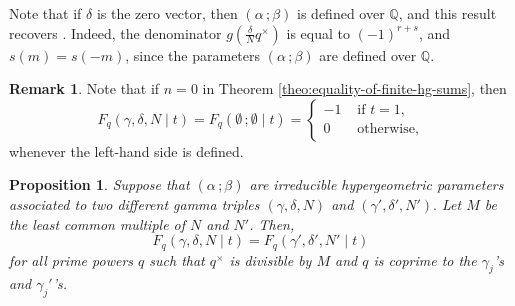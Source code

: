 \documentclass[11pt, reqno]{amsart}
\theoremstyle{plain}
\newtheorem{prop}[theo]{Proposition}
\theoremstyle{definition}
\newtheorem{rem}[theo]{Remark}
\newcommand{\Q}{\mathbb{Q}}
\newcommand{\ga}{\gamma}
\newcommand{\be}{\beta}
\newcommand{\al}{\alpha}
\begin{document}
Note that if $\delta$ is the zero vector, then $ (\al \, ;  \beta) $ is defined over $\Q$, and this result recovers \cite[Theorem 1.3]{BCM}.
Indeed, the denominator $g\left(\frac{\delta}{N} q^\times\right)$ is equal to $(-1)^{r+s}$, and $s(m) = s(-m)$, since the parameters $(\al \, ; \be)$ are defined over $\Q$.
\begin{rem}
Note that if $n=0$ in Theorem \ref{theo:equality-of-finite-hg-sums}, then
\[
F_q(\ga,\delta, N \mid t) = F_q (\emptyset\, ; \emptyset \mid t) = 
\begin{cases}
-1 &  \text{ if } t=1 , \\
0 & \text{ otherwise,}
\end{cases}
\]
whenever the left-hand side is defined. 

\end{rem}
\begin{prop}\label{prop:uniqueness-extensions}
    Suppose that $(\al \,;\be)$ are irreducible hypergeometric parameters associated to two different gamma triples $(\ga,\delta,N)$ and $(\ga',\delta',N').$ Let $M$ be the least common multiple of $N$ and $N'$. 
    Then,
    \begin{equation}\label{eq:cor-well-defined-extensions}
      F_q(\ga,\delta,N \mid t) = F_q(\ga',\delta',N' \mid t)  
    \end{equation}
    for all prime powers $q$ such that $q^\times$ is divisible by $M$ and $q$ is coprime to the $\ga_j$'s and $\ga_j'$'s.
\end{prop}
\end{document}
